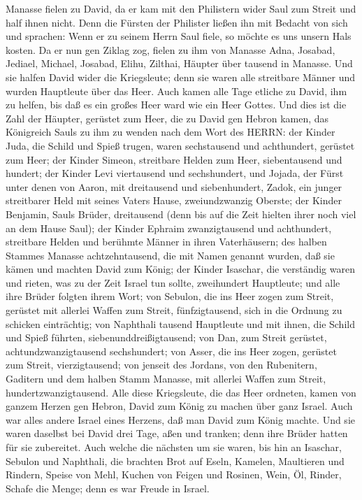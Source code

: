 Manasse fielen zu David, da er kam mit den Philistern wider Saul zum
Streit und half ihnen nicht. Denn die Fürsten der Philister ließen ihn
mit Bedacht von sich und sprachen: Wenn er zu seinem Herrn Saul fiele,
so möchte es uns unsern Hals kosten.  Da er nun gen Ziklag
zog, fielen zu ihm von Manasse Adna, Josabad, Jediael, Michael, Josabad,
Elihu, Zilthai, Häupter über tausend in Manasse.  Und sie
halfen David wider die Kriegsleute; denn sie waren alle streitbare
Männer und wurden Hauptleute über das Heer.  Auch kamen
alle Tage etliche zu David, ihm zu helfen, bis daß es ein großes Heer
ward wie ein Heer Gottes.  Und dies ist die Zahl der
Häupter, gerüstet zum Heer, die zu David gen Hebron kamen, das
Königreich Sauls zu ihm zu wenden nach dem Wort des HERRN: 
der Kinder Juda, die Schild und Spieß trugen, waren sechstausend und
achthundert, gerüstet zum Heer;  der Kinder Simeon,
streitbare Helden zum Heer, siebentausend und hundert;  der
Kinder Levi viertausend und sechshundert,  und Jojada, der
Fürst unter denen von Aaron, mit dreitausend und siebenhundert,
 Zadok, ein junger streitbarer Held mit seines Vaters
Hause, zweiundzwanzig Oberste;  der Kinder Benjamin, Sauls
Brüder, dreitausend (denn bis auf die Zeit hielten ihrer noch viel an
dem Hause Saul);  der Kinder Ephraim zwanzigtausend und
achthundert, streitbare Helden und berühmte Männer in ihren
Vaterhäusern;  des halben Stammes Manasse achtzehntausend,
die mit Namen genannt wurden, daß sie kämen und machten David zum König;
 der Kinder Isaschar, die verständig waren und rieten, was
zu der Zeit Israel tun sollte, zweihundert Hauptleute; und alle ihre
Brüder folgten ihrem Wort;  von Sebulon, die ins Heer zogen
zum Streit, gerüstet mit allerlei Waffen zum Streit, fünfzigtausend,
sich in die Ordnung zu schicken einträchtig;  von Naphthali
tausend Hauptleute und mit ihnen, die Schild und Spieß führten,
siebenunddreißigtausend;  von Dan, zum Streit gerüstet,
achtundzwanzigtausend sechshundert;  von Asser, die ins
Heer zogen, gerüstet zum Streit, vierzigtausend;  von
jenseit des Jordans, von den Rubenitern, Gaditern und dem halben Stamm
Manasse, mit allerlei Waffen zum Streit, hundertzwanzigtausend.
 Alle diese Kriegsleute, die das Heer ordneten, kamen von
ganzem Herzen gen Hebron, David zum König zu machen über ganz Israel.
Auch war alles andere Israel eines Herzens, daß man David zum König
machte.  Und sie waren daselbst bei David drei Tage, aßen
und tranken; denn ihre Brüder hatten für sie zubereitet. 
Auch welche die nächsten um sie waren, bis hin an Isaschar, Sebulon und
Naphthali, die brachten Brot auf Eseln, Kamelen, Maultieren und Rindern,
Speise von Mehl, Kuchen von Feigen und Rosinen, Wein, Öl, Rinder, Schafe
die Menge; denn es war Freude in Israel.

